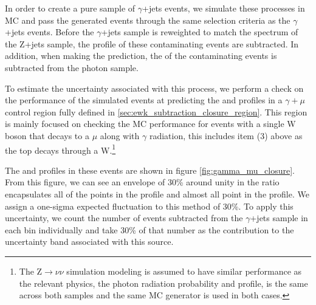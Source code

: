       In order to create a pure sample of $\gamma$+jets events, we simulate these processes in MC and pass the generated events through the same selection criteria as the $\gamma$+jets events. Before the $\gamma$+jets sample is reweighted to match the \pt spectrum of the Z+jets sample, the \pt profile of these contaminating events are subtracted. In addition, when making the \MET prediction, the \MET of the contaminating events is subtracted from the photon sample.

      To estimate the uncertainty associated with this process, we perform a check on the performance of the simulated events at predicting the \MET and \pt profiles in a $\gamma+\mu$ control region fully defined in \ref{sec:ewk_subtraction_closure_region}. This region is mainly focused on checking the MC performance for events with a single W boson that decays to a $\mu$ along with $\gamma$ radiation, this includes item (3) above as the top decays through a W.\footnote{The Z$\to\nu\nu$ simulation modeling is assumed to have similar performance as the relevant physics, the photon radiation probability and \pt profile, is the same across both samples and the same MC generator is used in both cases. }

       The \MET and \pt profiles in these events are shown in figure \ref{fig:gamma_mu_closure}. From this figure, we can see an envelope of 30\% around unity in the ratio encapsulates all of the points in the \MET profile and almost all point in the \pt profile. We assign a one-sigma expected fluctuation to this method of 30\%. To apply this uncertainty, we count the number of events subtracted from the $\gamma$+jets sample in each \MET bin individually and take 30\% of that number as the contribution to the uncertainty band associated with this source.

